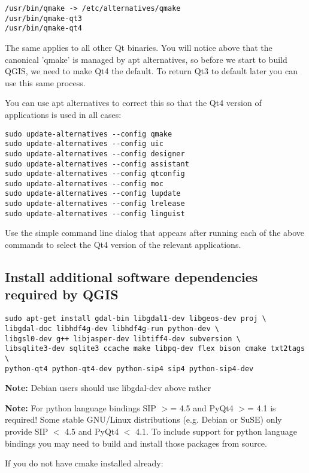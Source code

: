 \begin{verbatim}
/usr/bin/qmake -> /etc/alternatives/qmake 
/usr/bin/qmake-qt3
/usr/bin/qmake-qt4 
\end{verbatim}

The same applies to all other Qt binaries. You will notice above that the
canonical 'qmake' is managed by apt alternatives, so before we start to
build QGIS, we need to make Qt4 the default. To return Qt3 to default later
you can use this same process.

You can use apt alternatives to correct this so that the Qt4 version of
applications is used in all cases:

\begin{verbatim}
sudo update-alternatives --config qmake
sudo update-alternatives --config uic 
sudo update-alternatives --config designer 
sudo update-alternatives --config assistant 
sudo update-alternatives --config qtconfig 
sudo update-alternatives --config moc 
sudo update-alternatives --config lupdate 
sudo update-alternatives --config lrelease 
sudo update-alternatives --config linguist 
\end{verbatim}

Use the simple command line dialog that appears after running each of the
above commands to select the Qt4 version of the relevant applications.

\subsection{Install additional software dependencies required by QGIS}
\begin{verbatim}
sudo apt-get install gdal-bin libgdal1-dev libgeos-dev proj \
libgdal-doc libhdf4g-dev libhdf4g-run python-dev \
libgsl0-dev g++ libjasper-dev libtiff4-dev subversion \
libsqlite3-dev sqlite3 ccache make libpq-dev flex bison cmake txt2tags \
python-qt4 python-qt4-dev python-sip4 sip4 python-sip4-dev
\end{verbatim}

\textbf{Note:} Debian users should use libgdal-dev above rather

\textbf{Note:} For python language bindings SIP $>$= 4.5 and PyQt4 $>$= 4.1 is required! Some stable GNU/Linux
distributions (e.g. Debian or SuSE) only provide SIP $<$ 4.5 and PyQt4 $<$ 4.1. To include support for python 
language bindings you may need to build and install those packages from source.

If you do not have cmake installed already:

